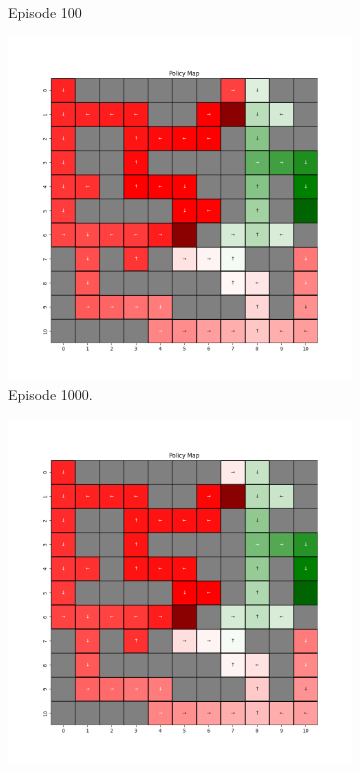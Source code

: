 \documentclass{assignment}
\begin{document}
\begin{figure}[H]
\begin{subfigure}{0.3\textwidth}
    \caption{Episode 100}
    \end{subfigure}
    \begin{subfigure}{0.3\textwidth}
        \includegraphics[width=\textwidth]{figures/policy_q/epsilon_sweep/policy_alpha_0.1_gamma_0.95_epsilon_0.8_iteration_1000.png}
    \caption{Episode 1000.}
    \end{subfigure}\hfill
    \begin{subfigure}{0.3\textwidth}
        \includegraphics[width=\textwidth]{figures/policy_q/epsilon_sweep/policy_alpha_0.1_gamma_0.95_epsilon_0.8_iteration_5000.png}

\end{subfigure}
\end{figure}
\end{document}
